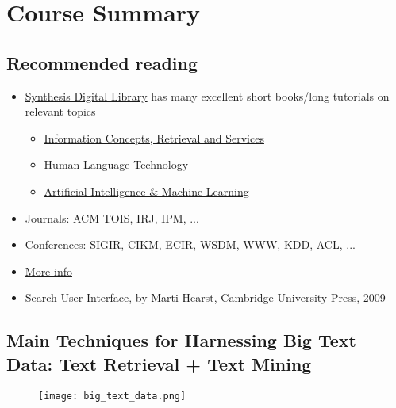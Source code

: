 \newpage
\section{Course Summary}

\subsection{Recommended reading}
\begin{itemize}
\item \href{http://www.morganclaypool.com/page/ForthcomingSynthesisLectures}{Synthesis Digital Library} has many excellent short books/long tutorials on relevant topics
\begin{itemize}
\item \href{http://www.morganclaypool.com/toc/icr/1/1}{Information Concepts, Retrieval and Services}
\item \href{http://www.morganclaypool.com/toc/hlt/1/1}{Human Language Technology}
\item \href{http://www.morganclaypool.com/toc/aim/1/1}{Artificial Intelligence \& Machine Learning}
\end{itemize}

\item Journals: ACM TOIS, IRJ, IPM, ...
\item Conferences: SIGIR, CIKM, ECIR, WSDM, WWW, KDD, ACL, ...
\item \href{http://timan.cs.uiuc.edu/resources}{More info}
\item \href{http://searchuserinterfaces.com/}{Search User Interface}, by Marti Hearst, Cambridge University Press, 2009
\end{itemize}


\subsection{Main Techniques for Harnessing Big Text Data: Text Retrieval + Text Mining}
\begin{figure}[H]
    \centering
    \texttt{[image: big\_text\_data.png]}
\end{figure}